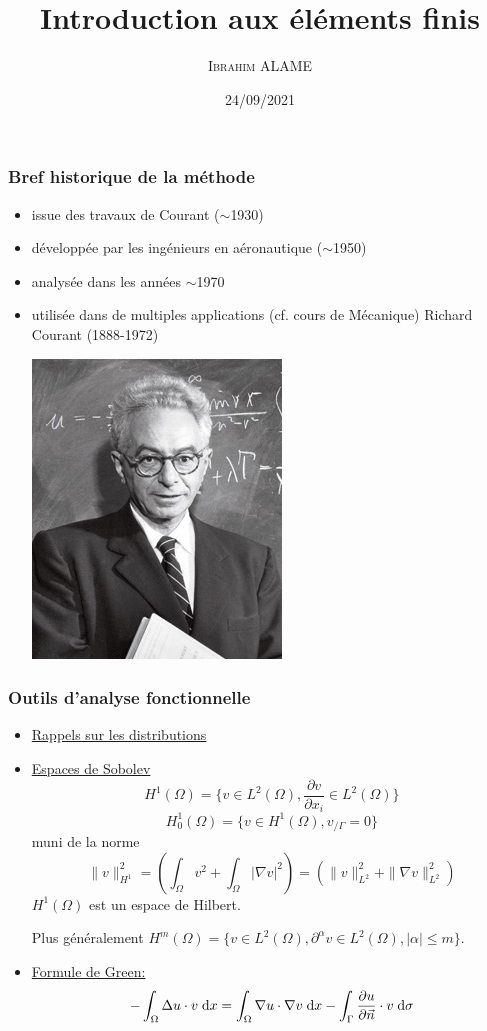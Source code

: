 \documentclass{beamer}
\title{Introduction aux éléments finis}
\author{ \textsc{Ibrahim ALAME}}\institute{ESTP}
\date{24/09/2021}
\def \de {{\rm d}}
\begin{document}
 \begin{frame}
  \titlepage
  \end{frame}
  
\begin{frame}
\frametitle{Bref historique de la méthode}

\begin{itemize}
\item issue des travaux de Courant ($\sim$1930)
\item développée par les ingénieurs en aéronautique ($\sim$1950)
\item analysée dans les années $\sim$1970
\item utilisée dans de multiples applications (cf. cours de Mécanique)
Richard Courant (1888-1972)
\begin{center}
\includegraphics[scale=0.3]{courant.jpg} 
\end{center}
\end{itemize}
\end{frame}
\begin{frame}
\frametitle{Outils d'analyse fonctionnelle }
\begin{itemize}
\item \underline{Rappels sur les distributions}
\item \underline{Espaces de Sobolev}
\[\displaystyle H^1(\Omega)=\{v\in L^2(\Omega), \frac{\partial v}{\partial x_i} \in L^2(\Omega)\}\]
\[H_0^1(\Omega)=\{v\in H^1(\Omega), v_{/\Gamma}=0\}\]
muni de la norme
\[\|v\|_{H^1}^2=\left(\int_{\Omega}v^2 + \int_{\Omega} |\nabla v|^2\right)=(\|v\|_{L^2}^2+\|\nabla v\|_{L^2}^2)\]
$H^1(\Omega)$ est un espace de Hilbert.

 Plus généralement $H^m(\Omega)=\{v\in L^2(\Omega), \partial^\alpha v\in L^2(\Omega), |\alpha|\leq m\}$.
\item \underline{Formule de Green:}
\[-\int_\Omega \Delta u\cdot v \; \de x = \int_\Omega \nabla u\cdot \nabla v \; \de x-\int_\Gamma  \frac{\partial u}{\partial \vec n} \cdot v \; \de \sigma\]
\end{itemize}

\end{frame}
\end{document}

